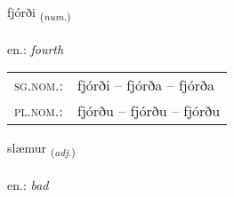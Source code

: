 \documentclass[frontgrid, backgrid]{flacards}\usepackage[]{graphicx}\usepackage[]{xcolor}
\begin{document}
\renewcommand{\flhead}{\vskip5pt \fboxsep=0pt {\small\bfseries\footnotesize Töluorð | Numeral}}
\renewcommand{\fcfoot}{\vskip5pt \fboxsep=0pt \hspace{2pt}{\small\bfseries\footnotesize 2K}}

\renewcommand{\blhead}{\vskip5pt {\small\bfseries\footnotesize Töluorð | Numeral }}
\renewcommand{\bcfoot}{\vskip5pt \hspace{2pt}{\small\bfseries\footnotesize 2K}}


{fjórði \small{\textsubscript{(\textit{num.})}} \\[1ex] %
\textphonetic{[fjourðɪ]} \\
en.: \emph{fourth} \\  [2ex]
\renewcommand*{\arraystretch}{0.8}
\begin{tabular}{ll}
\textsc{sg.nom.}: & fjórði  --  fjórða -- fjórða \\ 
\textsc{pl.nom.}: & fjórðu -- fjórðu -- fjórðu
\end{tabular}
}

\renewcommand{\flhead}{\vskip5pt \fboxsep=0pt {\small\bfseries\footnotesize Lýsingarorð | Adjective}}
\renewcommand{\fcfoot}{\vskip5pt \fboxsep=0pt \hspace{2pt}{\small\bfseries\footnotesize 2K}}

\renewcommand{\blhead}{\vskip5pt {\small\bfseries\footnotesize Lýsingarorð | Adjective }}
\renewcommand{\bcfoot}{\vskip5pt \hspace{2pt}{\small\bfseries\footnotesize 2K}}


{slæmur \small{\textsubscript{(\textit{adj.})}} \\[1ex] %
\textphonetic{[stlaiːmʏr]} \\
en.: \emph{bad} \\  [2ex]
\renewcommand*{\arraystretch}{0.8}
}
\end{document}
